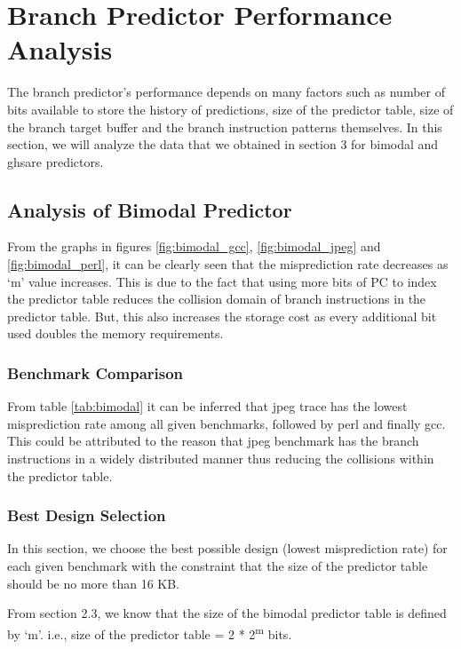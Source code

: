 \section{Branch Predictor Performance Analysis}
The branch predictor's performance depends on many factors such as number of bits available to store the history of predictions, size of the predictor table, size of the branch target buffer and the branch instruction patterns themselves. In this section, we will analyze the data that we obtained in section 3 for bimodal and ghsare predictors.

\subsection{Analysis of Bimodal Predictor}
From the graphs in figures \ref{fig:bimodal_gcc}, \ref{fig:bimodal_jpeg} and \ref{fig:bimodal_perl}, it can be clearly seen that the misprediction rate decreases as `m' value increases. This is due to the fact that using more bits of PC to index the predictor table reduces the collision domain of branch instructions in the predictor table. But, this also increases the storage cost as every additional bit used doubles the memory requirements. 

\subsubsection{Benchmark Comparison}
From table \ref{tab:bimodal} it can be inferred that jpeg trace has the lowest misprediction rate among all given benchmarks, followed by perl and finally gcc. This could be attributed to the reason that jpeg benchmark has the branch instructions in a widely distributed manner thus reducing the collisions within the predictor table.

\subsubsection{Best Design Selection}
In this section, we choose the best possible design (lowest misprediction rate) for each given benchmark with the constraint that the size of the predictor table should be no more than 16 KB.

From section 2.3, we know that the size of the bimodal predictor table is defined by `m'. i.e., size of the predictor table = 2 * 2\textsuperscript{m} bits.

